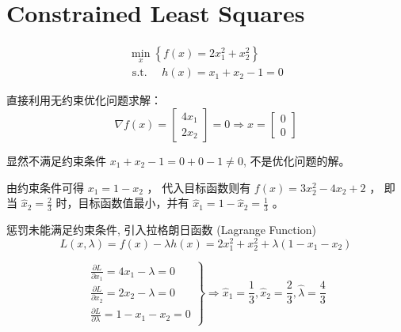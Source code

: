 \chapter{Constrained Least Squares}

\begin{problem}
    $$
\begin{array}{l}
\min _{x}\left\{f(x)=2 x_{1}^{2}+x_{2}^{2}\right\} \\
\text { s.t. } \quad h(x)=x_{1}+x_{2}-1=0
\end{array}
$$

直接利用无约束优化问题求解： 
$$ \nabla f(x)=\left[\begin{array}{l}4 x_{1} \\ 2 x_{2}\end{array}\right]=0 \Rightarrow x=\left[\begin{array}{l}0 \\ 0\end{array}\right] $$

显然不满足约束条件 $ x_{1}+x_{2}-1=0+0-1 \neq 0 $, 不是优化问题的解。
\end{problem}

由约束条件可得 $ x_{1}=1-x_{2} $ ， 代入目标函数则有 $ f(x)=3 x_{2}^{2}-4 x_{2}+2 $ ， 即当 $ \hat{x}_{2}=\frac{2}{3} $ 时，目标函数值最小，并有 $ \hat{x}_{1}=1-\hat{x}_{2}=\frac{1}{3} $ 。


惩罚未能满足约束条件, 引入拉格朗日函数 (Lagrange Function)
$$
L(x, \lambda)=f(x)-\lambda h(x)=2 x_{1}^{2}+x_{2}^{2}+\lambda\left(1-x_{1}-x_{2}\right)
$$

$$ \left.\begin{array}{l}\frac{\partial L}{\partial x_{1}}=4 x_{1}-\lambda=0 \\ \frac{\partial L}{\partial x_{2}}=2 x_{2}-\lambda=0 \\ \frac{\partial L}{\partial \lambda}=1-x_{1}-x_{2}=0\end{array}\right\} \Rightarrow \hat{x}_{1}=\frac{1}{3}, \hat{x}_{2}=\frac{2}{3}, \hat{\lambda}=\frac{4}{3} $$

